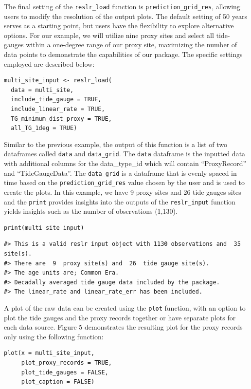 The final setting of the \texttt{reslr\_load} function is \texttt{prediction\_grid\_res}, allowing users to modify the resolution of the output plots. The default setting of 50 years serves as a starting point, but users have the flexibility to explore alternative options. For our example, we will utilize nine proxy sites and select all tide-gauges within a one-degree range of our proxy site, maximizing the number of data points to demonstrate the capabilities of our package. The specific settings employed are described below:
\scriptsize
\begin{verbatim}
multi_site_input <- reslr_load(
  data = multi_site,
  include_tide_gauge = TRUE,
  include_linear_rate = TRUE,
  TG_minimum_dist_proxy = TRUE,
  all_TG_1deg = TRUE)
\end{verbatim}
\normalsize
Similar to the previous example, the output of this function is a list of two dataframes called \texttt{data} and \texttt{data\_grid}. The \texttt{data} dataframe is the inputted data with additional columns for the data\_type\_id which will contain ``ProxyRecord'' and ``TideGaugeData''. The \texttt{data\_grid} is a dataframe that is evenly spaced in time based on the \texttt{prediction\_grid\_res} value chosen by the user and is used to create the plots. In this example, we have 9 proxy sites and 26 tide gauges sites and the \texttt{print} provides insights into the outputs of the \texttt{reslr\_input} function yields insights such as the number of observations (1,130).
\scriptsize
\begin{verbatim}
print(multi_site_input)
\end{verbatim}
\begin{verbatim}
#> This is a valid reslr input object with 1130 observations and  35 site(s).
#> There are  9  proxy site(s) and  26  tide gauge site(s).
#> The age units are; Common Era. 
#> Decadally averaged tide gauge data included by the package. 
#> The linear_rate and linear_rate_err has been included.
\end{verbatim}
\normalsize
A plot of the raw data can be created using the \texttt{plot} function, with an option to plot the tide gauges and the proxy records together or have separate plots for each data source. Figure 5 demonstrates the resulting plot for the proxy records only using the following function:
\scriptsize
\begin{verbatim}
plot(x = multi_site_input,
     plot_proxy_records = TRUE,
     plot_tide_gauges = FALSE,
     plot_caption = FALSE)
\end{verbatim}
